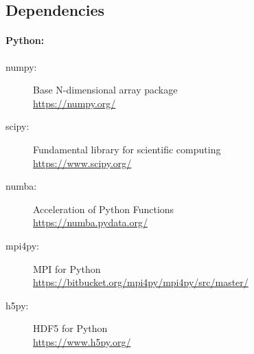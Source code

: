 \subsection{Dependencies}
% 
\paragraph{Python:}
\begin{description}
\item[numpy:] Base N-dimensional array package \cite{2019arXiv190710121V}\\
\url{https://numpy.org/}
\item[scipy:] Fundamental library for scientific computing \cite{2019arXiv190710121V}\\
\url{https://www.scipy.org/} 
\item[numba:] Acceleration of Python Functions \cite{Lam2015}\\
\url{https://numba.pydata.org/}
\item[mpi4py:] MPI for Python \cite{Dalcn2005, Dalcn2008, Dalcin2011}\\
\url{https://bitbucket.org/mpi4py/mpi4py/src/master/}
\item[h5py:] HDF5 for Python \cite{collette_python_hdf5_2014, hdf5}\\
\url{https://www.h5py.org/}
\end{description}
% 
